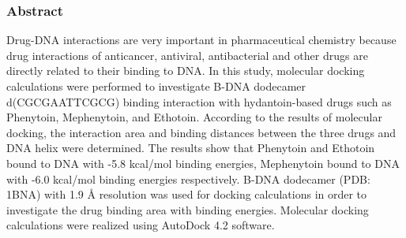 \frametitle{Abstract}
Drug-DNA interactions are very important in pharmaceutical chemistry because drug interactions of anticancer, antiviral, antibacterial and other drugs are directly related to their binding to DNA. In this study, molecular docking calculations were performed to investigate B-DNA dodecamer d(CGCGAATTCGCG) binding interaction with hydantoin-based drugs such as Phenytoin, Mephenytoin, and Ethotoin. According to the results of molecular docking, the interaction area and binding distances between the three drugs and DNA helix were determined. The results show that Phenytoin and Ethotoin bound to DNA with -5.8 kcal/mol binding energies, Mephenytoin bound to DNA with -6.0 kcal/mol binding energies respectively. B-DNA dodecamer (PDB: 1BNA) with 1.9 Å resolution was used for docking calculations in order to investigate the drug binding area with binding energies. Molecular docking calculations were realized using AutoDock 4.2 software.